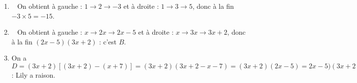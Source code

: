 
\medskip

%
%

\begin{enumerate}
\item ~%
On obtient à gauche : $1 \to 2 \to - 3$ et à droite : $1 \to 3  \to 5$, donc à la fin $- 3 \times 5 = - 15$.
\item ~%
On obtient à gauche : $x \to 2x \to 2x - 5$ et à droite : $x \to 3x  \to 3x + 2$, donc à la fin $(2x - 5)(3x + 2)$ : c'est $B$.

\item %


On a $D = (3x + 2)[(3x + 2) - (x + 7)] = (3x + 2)(3x + 2 - x - 7) = (3x + 2)(2x - 5) = 2x - 5)(3x + 2) = B$ : Lily a raison.
\end{enumerate}

\vspace{0,5cm}

